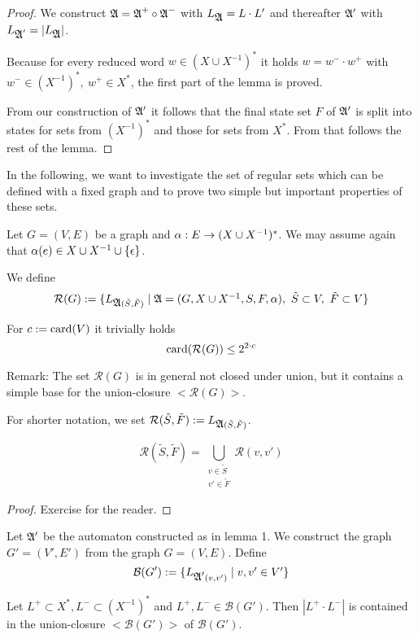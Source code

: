 \begin{proof}
We construct $\mbox{$\mathfrak{A}$} = \mbox{$\mathfrak{A}$}^+ \circ \mbox{$\mathfrak{A}$}^-$ with $L_{\mbox{$\mathfrak{A}$}} = L \cdot L'$ and
thereafter $\mbox{$\mathfrak{A'}$}$ with $L_{\mbox{$\mathfrak{A}$}'} = |L_{\mbox{$\mathfrak{A}$}}|$.

Because for every reduced word $w \in (X\cup X^{-1})^*$ it holds $w = w^- \cdot
w^+$ with $w^- \in (X^{-1})^*,\ w^+ \in X^*$, the first part of the lemma is
proved.

From our construction of $\mbox{$\mathfrak{A'}$}$ it follows that the final state set
$F$ of $\mbox{$\mathfrak{A'}$}$ is split into states for sets from $(X^{-1})^*$ and those
for sets from $X^*$. From that follows the rest of the lemma.
\end{proof}

\bigskip
In the following, we want to investigate the set of regular sets which can be
defined with a fixed graph and to prove two simple but important properties of
these sets.

Let $G = (V, E)$ be a graph and $\alpha : E \to (X \cup {X}^{-1})^*$. We may
assume again that $\alpha(e) \in X \cup {X}^{-1} \cup \mbox{$\{\epsilon\}$}$.

We define
\[ \mathcal{R}(G) := \mbox{$\{L_{\mbox{$\mathfrak{A}$}(\tilde{S},\tilde{F})} \mid \mbox{$\mathfrak{A}$} = (G, X
\cup X^{-1}, S, F, \alpha),\ \tilde{S} \subset V,\ \tilde{F} \subset V\}$} \]

For $c := \mathrm{card}({V})$ it trivially holds 
\[ \mathrm{card}({\mathcal{R}(G)}) \leq 2^{2 \cdot c} \]

Remark: The set $\mathcal{R}(G)$ is in general not closed under union, but it
contains a simple base for the union-closure ${<}\mathcal{R}(G){>}$.

For shorter notation, we set $\mathcal{R}(\tilde{S},\tilde{F}) :=
L_{\mbox{$\mathfrak{A}$}(\tilde{S},\tilde{F})}$.

\begin{lemma}
\[ \mathcal{R}(\tilde{S},\tilde{F}) = \bigcup_{\substack{v \in \tilde{S}\\v'
\in \tilde{F}}} \mathcal{R}(v, v') \]
\end{lemma}

\begin{proof}
Exercise for the reader.
\end{proof}

\bigskip
Let $\mbox{$\mathfrak{A'}$}$ be the automaton constructed as in lemma 1. We construct the graph
$G' = (V', E')$ from the graph $G = (V, E)$. Define
\[ \mathcal{B}(G') := \mbox{$\{L_{\mbox{$\mathfrak{A'}$}(v, v')} \mid v, v' \in V'\}$} \]

\bigskip
\begin{lemma}
Let $L^+ \subset X^*, L^- \subset (X^{-1})^*$ and $L^+, L^- \in
\mathcal{B}(G')$. Then $|L^+ \cdot L^-|$ is contained in the union-closure
${<}\mathcal{B}(G'){>}$ of $\mathcal{B}(G')$.
\end{lemma}

